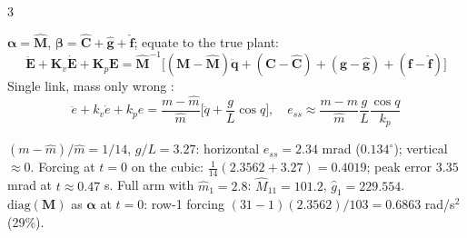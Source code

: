 \begin{multicols}{3}
\begin{fbx}
$\boldsymbol\alpha=\hat{\mathbf M}$, $\boldsymbol\beta=\hat{\mathbf C}+\hat{\mathbf g}+\hat{\mathbf f}$; equate to the true plant:
\[\ddot{\mathbf E}+\mathbf K_v\dot{\mathbf E}+\mathbf K_p\mathbf E=\hat{\mathbf M}^{-1}\big[(\mathbf M{-}\hat{\mathbf M})\ddot{\mathbf q}+(\mathbf C{-}\hat{\mathbf C})+(\mathbf g{-}\hat{\mathbf g})+(\mathbf f{-}\hat{\mathbf f})\big]\]
Single link, mass only wrong \added:
\[\ddot e+k_v\dot e+k_pe=\frac{m-\hat m}{\hat m}\Big[\ddot q+\frac gL\cos q\Big],\quad e_{ss}\approx\frac{m-\hat m}{\hat m}\frac gL\frac{\cos q}{k_p}\]
\end{fbx}
\begin{worked}[practical $\hat m=2.8$, $m=3$, $L=3$, $k_p=100$]
$(m-\hat m)/\hat m=1/14$, $g/L=3.27$: horizontal $e_{ss}=2.34$ mrad ($0.134^\circ$); vertical $\approx0$. Forcing at $t=0$ on the cubic: $\tfrac1{14}(2.3562+3.27)=0.4019$; peak error $3.35$ mrad at $t\approx0.47$ s. Full arm with $\hat m_1=2.8$: $\hat M_{11}=101.2$, $\hat g_1=229.554$. $\mathrm{diag}(\mathbf M)$ as $\boldsymbol\alpha$ at $t=0$: row-1 forcing $(31{-}1)(2.3562)/103=0.6863$ rad/s$^2$ (29\%). \chk
\end{worked}


\end{multicols}
